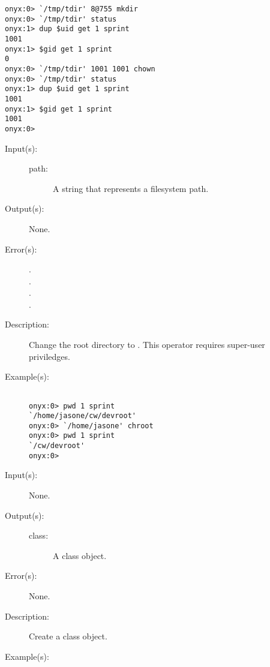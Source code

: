 \begin{description}
\begin{description}
\begin{verbatim}
onyx:0> `/tmp/tdir' 8@755 mkdir
onyx:0> `/tmp/tdir' status
onyx:1> dup $uid get 1 sprint
1001
onyx:1> $gid get 1 sprint
0
onyx:0> `/tmp/tdir' 1001 1001 chown
onyx:0> `/tmp/tdir' status
onyx:1> dup $uid get 1 sprint
1001
onyx:1> $gid get 1 sprint
1001
onyx:0>
		\end{verbatim}
	\end{description}
\label{systemdict:chroot}
\item[{\onyxop{path}{chroot}{--}}: ]
	\begin{description}\item[]
	\item[Input(s): ]
		\begin{description}\item[]
		\item[path: ]
			A string that represents a filesystem path.
		\end{description}
	\item[Output(s): ] None.
	\item[Error(s): ]
		\begin{description}\item[]
		\item[.]
		\item[.]
		\item[.]
		\item[.]
		\end{description}
	\item[Description: ]
		Change the root directory to .  This operator
		requires super-user priviledges.
	\item[Example(s): ]\begin{verbatim}

onyx:0> pwd 1 sprint
`/home/jasone/cw/devroot'
onyx:0> `/home/jasone' chroot
onyx:0> pwd 1 sprint
`/cw/devroot'
onyx:0>
		\end{verbatim}
	\end{description}
\label{systemdict:class}
\item[{\onyxop{--}{class}{class}}: ]
	\begin{description}\item[]
	\item[Input(s): ] None.
	\item[Output(s): ]
		\begin{description}\item[]
		\item[class: ]
			A class object.
		\end{description}
	\item[Error(s): ] None.
	\item[Description: ]
		Create a class object.
	\item[Example(s): ]\begin{verbatim}


\end{verbatim}
\end{description}
\end{description}
